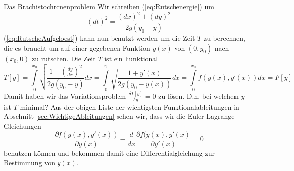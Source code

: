 \begin{example}{Das Brachistochronenproblem}
 Wir schreiben (\ref{eq:Rutschenergie}) um
 \begin{equation}
   (dt)^2=\frac{(dx)^2+(dy)^2}{2g(y_0-y)}
   \label{eq:RutscheAufgeloest}
 \end{equation}
 (\ref{eq:RutscheAufgeloest}) kann nun benutzt werden um die Zeit $T$ zu berechnen,
 die es braucht um auf einer gegebenen Funktion $y(x)$ von $(0,y_0)$ nach
 $(x_0,0)$ zu rutschen. Die Zeit $T$ ist ein Funktional
 \begin{equation}
    T[y]=\int\limits_{0}^{x_0}\sqrt{\frac{1+\left(\frac{dy}{dx}\right)^2}{2g(y_0-y)}}dx
    =\int\limits_{0}^{x_0}\sqrt{\frac{1+y'(x)}{2g(y_0-y(x))}}dx
    =\int\limits_{0}^{x_0}f(y(x),y'(x))dx=F[y]
   \label{eq:Zeitfunktional}
 \end{equation}
 Damit haben wir das Variationsproblem $\frac{\delta T[y]}{\delta y}=0$ zu
 lösen. D.h. bei welchem $y$ ist $T$ minimal? Aus der obigen Liste der
 wichtigsten Funktionalableitungen in Abschnitt \ref{sec:WichtigeAbleitungen}
 sehen wir, dass wir die Euler-Lagrange Gleichungen
 \[ 
   \frac{\partial f(y(x),y'(x))}{\partial y(x)}
    -\frac{d}{dx} \frac{\partial f(y(x),y'(x)}{\partial y'(x)}=0
 \]
 benutzen können und bekommen damit eine Differentialgleichung zur Bestimmung
 von $y(x)$.
\end{example}
%
